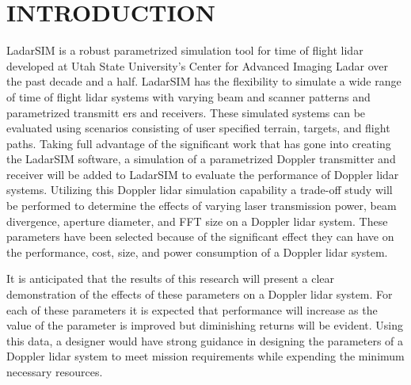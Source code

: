 %
%
%
%

\chapter{INTRODUCTION}
\thispagestyle{empty}

LadarSIM is a robust parametrized simulation tool for time of flight lidar
developed at Utah State University's Center
for Advanced Imaging Ladar over the past decade and a half.
LadarSIM has the flexibility to simulate a wide range of time of flight
lidar systems with varying beam and scanner patterns and parametrized transmitt
ers and receivers.
These simulated systems can be evaluated using scenarios consisting of
user specified terrain, targets, and flight paths.
Taking full advantage of the significant work that has gone into creating
the LadarSIM software, a simulation of a parametrized Doppler transmitter
and receiver will be added to LadarSIM to evaluate the performance of Doppler
lidar systems.
Utilizing this Doppler lidar simulation capability a trade-off study will
be performed to determine the effects of varying laser transmission power,
beam divergence, aperture diameter, and FFT size on a Doppler lidar system.
These parameters have been selected because of the significant effect they
can have on the performance, cost, size, and power consumption of a Doppler
lidar system.

It is anticipated that the results of this research will present a clear
demonstration of the effects of these parameters on a Doppler lidar system.
For each of these parameters it is expected that performance will increase
as the value of the parameter is improved but diminishing returns will
be evident.
Using this data, a designer would have strong guidance in designing the
parameters of a Doppler lidar system to meet mission requirements while
expending the minimum necessary resources.

